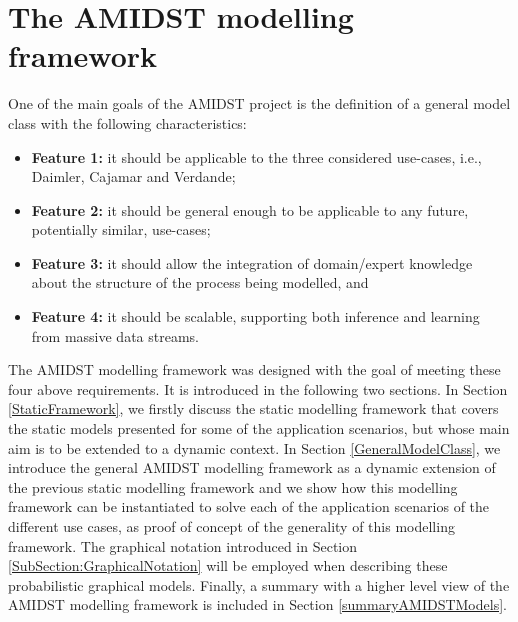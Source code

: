 \section{The AMIDST modelling framework}\label{section:AMIDSTmodelClass}

One of the main goals of the AMIDST project is the definition of a general model class with the following characteristics: 

\begin{itemize}
\item \textbf{Feature 1:} it should be applicable to the three considered use-cases, i.e., Daimler, Cajamar and Verdande;

\item \textbf{Feature 2:}  it should be general enough to be applicable to any future, potentially similar, use-cases;

\item \textbf{Feature 3:} it should allow the integration of domain/expert knowledge about the structure of the process being modelled, and

\item \textbf{Feature 4:} it should be scalable, supporting both inference and learning from massive data streams.

\end{itemize}



The AMIDST modelling framework was designed with the goal of meeting these four above requirements. It is introduced in the following two sections. In Section \ref{StaticFramework}, we firstly discuss the static modelling framework that covers the static models presented for some of the application scenarios, but whose main aim is to be extended to a dynamic context. In Section \ref{GeneralModelClass}, we introduce the general AMIDST modelling framework as a dynamic extension of the previous static modelling framework and we show how this modelling framework can be instantiated to solve each of the application scenarios of the different use cases, as proof of concept of the generality of this modelling framework. The graphical notation introduced in Section \ref{SubSection:GraphicalNotation} will be employed when describing these probabilistic graphical models. Finally, a summary with a higher level view of the AMIDST modelling framework is included in Section \ref{summaryAMIDSTModels}.

